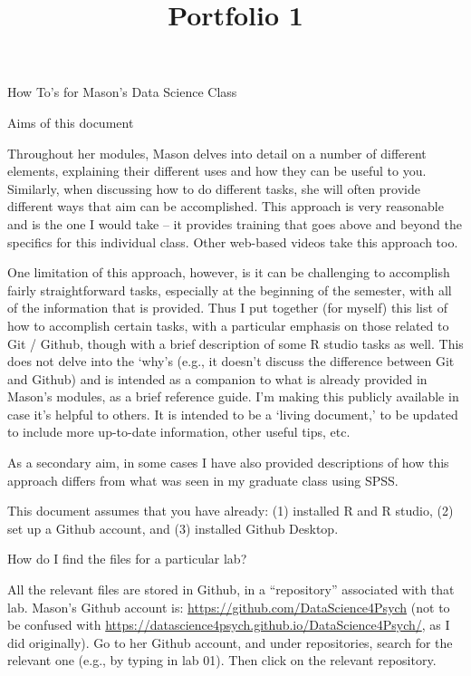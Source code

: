 \documentclass[
]{article}
\title{Portfolio 1}
\author{}
\date{\vspace{-2.5em}}
\begin{document}
\maketitle

How To's for Mason's Data Science Class

Aims of this document

Throughout her modules, Mason delves into detail on a number of
different elements, explaining their different uses and how they can be
useful to you. Similarly, when discussing how to do different tasks, she
will often provide different ways that aim can be accomplished. This
approach is very reasonable and is the one I would take -- it provides
training that goes above and beyond the specifics for this individual
class. Other web-based videos take this approach too.

One limitation of this approach, however, is it can be challenging to
accomplish fairly straightforward tasks, especially at the beginning of
the semester, with all of the information that is provided. Thus I put
together (for myself) this list of how to accomplish certain tasks, with
a particular emphasis on those related to Git / Github, though with a
brief description of some R studio tasks as well. This does not delve
into the `why's (e.g., it doesn't discuss the difference between Git and
Github) and is intended as a companion to what is already provided in
Mason's modules, as a brief reference guide. I'm making this publicly
available in case it's helpful to others. It is intended to be a `living
document,' to be updated to include more up-to-date information, other
useful tips, etc.

As a secondary aim, in some cases I have also provided descriptions of
how this approach differs from what was seen in my graduate class using
SPSS.

This document assumes that you have already: (1) installed R and R
studio, (2) set up a Github account, and (3) installed Github Desktop.

How do I find the files for a particular lab?

All the relevant files are stored in Github, in a ``repository''
associated with that lab. Mason's Github account is:
\url{https://github.com/DataScience4Psych} (not to be confused with
\url{https://datascience4psych.github.io/DataScience4Psych/}, as I did
originally). Go to her Github account, and under repositories, search
for the relevant one (e.g., by typing in lab 01). Then click on the
relevant repository.
\end{document}
